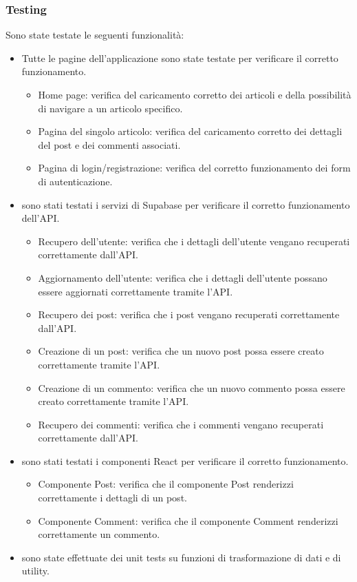 \documentclass[8pt]{beamer}
\begin{document}
\begin{frame}[allowframebreaks]
    \frametitle{Testing}
    Sono state testate le seguenti funzionalità:
    \begin{itemize}
        \item Tutte le pagine dell'applicazione sono state testate per verificare il corretto funzionamento.
        \begin{itemize}
            \item Home page: verifica del caricamento corretto dei articoli e della possibilità di navigare a un articolo specifico.
            \item Pagina del singolo articolo: verifica del caricamento corretto dei dettagli del post e dei commenti associati.
            \item Pagina di login/registrazione: verifica del corretto funzionamento dei form di autenticazione.
        \end{itemize}
        \item sono stati testati i servizi di Supabase per verificare il corretto funzionamento dell'API.
        \begin{itemize}
            \item Recupero dell'utente: verifica che i dettagli dell'utente vengano recuperati correttamente dall'API.
            \item Aggiornamento dell'utente: verifica che i dettagli dell'utente possano essere aggiornati correttamente tramite l'API.
            \item Recupero dei post: verifica che i post vengano recuperati correttamente dall'API.
            \item Creazione di un post: verifica che un nuovo post possa essere creato correttamente tramite l'API.
            \item Creazione di un commento: verifica che un nuovo commento possa essere creato correttamente tramite l'API.
            \item Recupero dei commenti: verifica che i commenti vengano recuperati correttamente dall'API.
        \end{itemize}
        \item sono stati testati i componenti React per verificare il corretto funzionamento.
        \begin{itemize}
            \item Componente Post: verifica che il componente Post renderizzi correttamente i dettagli di un post.
            \item Componente Comment: verifica che il componente Comment renderizzi correttamente un commento.
        \end{itemize}
        \item sono state effettuate dei unit tests su funzioni di trasformazione di dati e di utility.
    \end{itemize}
\end{frame}
\end{document}
